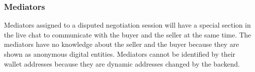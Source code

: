 \documentclass[12pt]{article}
\begin{document}
\subsubsection { Mediators } 

Mediators assigned to a disputed negotiation session will have a special section in the live chat to communicate with the buyer and the seller at the same time. The mediators have no knowledge about the seller and the buyer because they are shown as anonymous digital entities. Mediators cannot be identified by their wallet addresses because they are dynamic addresses changed by the backend.
\end{document}
